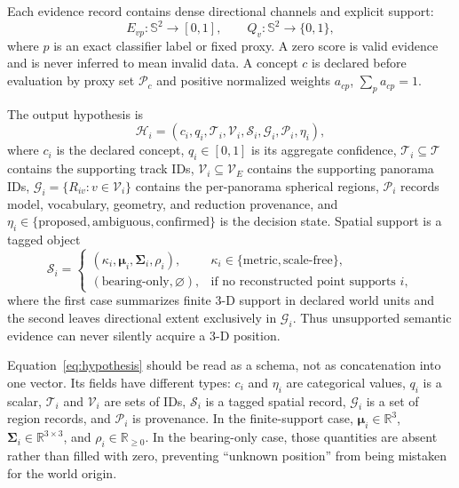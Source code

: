 \documentclass[a4paper,9pt]{extarticle}
\newcommand{\sphere}{\mathbb S^2}
\newcommand{\R}{\mathbb R}
\begin{document}
Each evidence record contains dense directional channels and explicit support:
\begin{equation}
 E_{vp}:\sphere\rightarrow[0,1],\qquad
 Q_v:\sphere\rightarrow\{0,1\},
 \label{eq:evidence}
\end{equation}
where $p$ is an exact classifier label or fixed proxy. A zero score is valid evidence and is never inferred to mean invalid data. A concept $c$ is declared before evaluation by proxy set $\mathcal P_c$ and positive normalized weights $a_{cp}$, $\sum_p a_{cp}=1$.

The output hypothesis is
\begin{equation}
 \mathcal H_i=(c_i,q_i,\mathcal T_i,\mathcal V_i,
 \mathcal S_i,\mathcal G_i,\mathcal P_i,\eta_i),
 \label{eq:hypothesis}
\end{equation}
where $c_i$ is the declared concept, $q_i\in[0,1]$ is its aggregate confidence, $\mathcal T_i\subseteq\mathcal T$ contains the supporting track IDs, $\mathcal V_i\subseteq\mathcal V_E$ contains the supporting panorama IDs, $\mathcal G_i=\{R_{iv}:v\in\mathcal V_i\}$ contains the per-panorama spherical regions, $\mathcal P_i$ records model, vocabulary, geometry, and reduction provenance, and $\eta_i\in\{\text{proposed},\text{ambiguous},\text{confirmed}\}$ is the decision state. Spatial support is a tagged object
\begin{equation}
 \mathcal S_i=
 \begin{cases}
  (\kappa_i,\bm\mu_i,\bm\Sigma_i,\rho_i),
   & \kappa_i\in\{\text{metric},\text{scale-free}\},\\
  (\text{bearing-only},\varnothing),
   & \text{if no reconstructed point supports }i,
 \end{cases}
 \label{eq:spatialsupport}
\end{equation}
where the first case summarizes finite 3-D support in declared world units and the second leaves directional extent exclusively in $\mathcal G_i$. Thus unsupported semantic evidence can never silently acquire a 3-D position.

Equation~\ref{eq:hypothesis} should be read as a schema, not as concatenation
into one vector. Its fields have different types: $c_i$ and $\eta_i$ are
categorical values, $q_i$ is a scalar, $\mathcal T_i$ and $\mathcal V_i$ are
sets of IDs, $\mathcal S_i$ is a tagged spatial record, $\mathcal G_i$ is a
set of region records, and $\mathcal P_i$ is provenance. In the finite-support
case, $\bm\mu_i\in\R^3$, $\bm\Sigma_i\in\R^{3\times3}$, and
$\rho_i\in\R_{\ge0}$. In the bearing-only case, those quantities are absent
rather than filled with zero, preventing ``unknown position'' from being
mistaken for the world origin.
\end{document}
